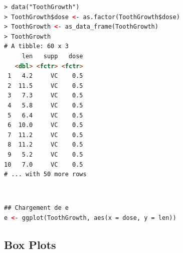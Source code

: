 \begin{lstlisting}[language=html]
> data("ToothGrowth")
> ToothGrowth$dose <- as.factor(ToothGrowth$dose)
> ToothGrowth <- as_data_frame(ToothGrowth)
> ToothGrowth
# A tibble: 60 x 3
     len   supp   dose
   <dbl> <fctr> <fctr>
 1   4.2     VC    0.5
 2  11.5     VC    0.5
 3   7.3     VC    0.5
 4   5.8     VC    0.5
 5   6.4     VC    0.5
 6  10.0     VC    0.5
 7  11.2     VC    0.5
 8  11.2     VC    0.5
 9   5.2     VC    0.5
10   7.0     VC    0.5
# ... with 50 more rows
\end{lstlisting}
\textcolor{white}{.}\newline
\begin{lstlisting}[language=html]
## Chargement de e
e <- ggplot(ToothGrowth, aes(x = dose, y = len))
\end{lstlisting}
\subsection{Box Plots}

